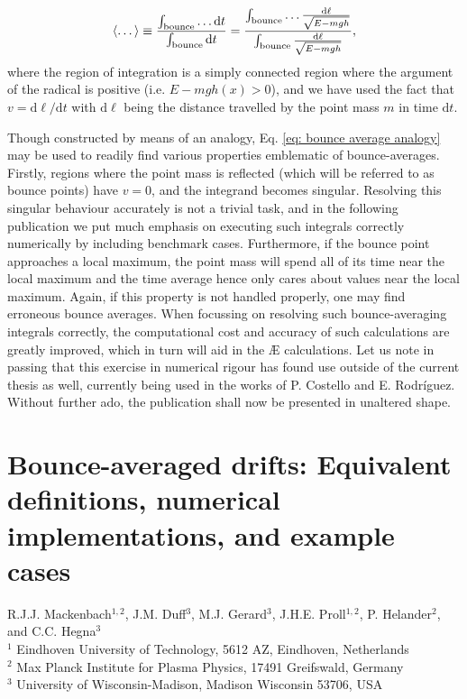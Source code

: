 \begin{equation}
    \langle \dots \rangle \equiv \frac{ \int_{\rm bounce} \dots \mathrm{d} t }{ \int_{\rm bounce} \mathrm{d} t } = \frac{ \int_{\rm bounce} \dots \frac{\mathrm{d} \ell}{\sqrt{E - mgh}} }{ \int_{\rm bounce} \frac{\mathrm{d} \ell}{\sqrt{E - mgh}} },
    \label{eq: bounce average analogy}
\end{equation}
where the region of integration is a simply connected region where the argument of the radical is positive (i.e. $E - mgh(x) > 0$), and we have used the fact that $v = \mathrm{d}\ell/\mathrm{d}t$ with $\mathrm{d}\ell$ being the distance travelled by the point mass $m$ in time $\mathrm{d} t$. \par 
Though constructed by means of an analogy, Eq. \eqref{eq: bounce average analogy} may be used to readily find various properties emblematic of bounce-averages. Firstly, regions where the point mass is reflected (which will be referred to as bounce points) have $v=0$, and the integrand becomes singular. Resolving this singular behaviour accurately is not a trivial task, and in the following publication we put much emphasis on executing such integrals correctly numerically by including benchmark cases. Furthermore, if the bounce point approaches a local maximum, the point mass will spend all of its time near the local maximum and the time average hence only cares about values near the local maximum. Again, if this property is not handled properly, one may find erroneous bounce averages. When focussing on resolving such bounce-averaging integrals correctly, the computational cost and accuracy of such calculations are greatly improved, which in turn will aid in the \AE{} calculations. Let us note in passing that this exercise in numerical rigour has found use outside of the current thesis as well, currently being used in the works of P. Costello and E. Rodr\'iguez. Without further ado, the publication shall now be presented in unaltered shape.
\vfill \newpage

\section*{Bounce-averaged drifts: Equivalent definitions, numerical implementations, and example cases}
\small{R.J.J. Mackenbach$^{1,2}$, J.M. Duff$^{3}$, M.J. Gerard$^{3}$, J.H.E. Proll$^{1,2}$, P. Helander$^{2}$, and C.C. Hegna$^{3}$} \\
\small{$^1$ Eindhoven University of Technology, 5612 AZ, Eindhoven, Netherlands} \\
\small{$^2$ Max Planck Institute for Plasma Physics, 17491 Greifswald, Germany} \\
\small{$^3$ University of Wisconsin-Madison, Madison Wisconsin 53706, USA}


